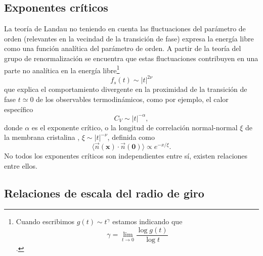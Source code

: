 \subsection{Exponentes críticos}
\label{exponentes_criticos}
La teoría de Landau no teniendo en cuenta las fluctuaciones del parámetro de
orden (relevantes en la vecindad de la transición de fase) expresa la energía
libre como una función analítica del parámetro de orden. A partir de la teoría
del grupo de renormalización \cite{Cardy} se encuentra que estas fluctuaciones contribuyen
en una parte no analítica en la energía libre\footnote{Cuando escribimos
  $g(t)\sim t^{\gamma}$ estamos indicando que $$\gamma=\lim_{t\rightarrow
  0}\frac{\log g(t)}{\log t}$$.}
\begin{equation}
f_s(t)\sim|t|^{2\nu}
\end{equation}
que explica el comportamiento divergente en la proximidad de la transición de
fase $t\simeq 0$ de los observables termodinámicos, como por ejemplo, el calor específico
\begin{equation*}
C_V\sim|t|^{-\alpha},
\end{equation*}
donde $\alpha$ es el exponente crítico, o la longitud de correlación
normal-normal $\xi$ de la membrana cristalina \cite{David:normal}, $\xi\sim|t|^{-\nu}$,
definida como
\begin{equation*}
\langle \vec{n}(\mathbf{x})\cdot\vec{n}(\mathbf{0})\rangle\propto e^{-x/\xi}.
\end{equation*}
No todos los exponentes críticos son independientes entre sí, existen
relaciones entre ellos.

\subsection{Relaciones de escala del radio de giro}


